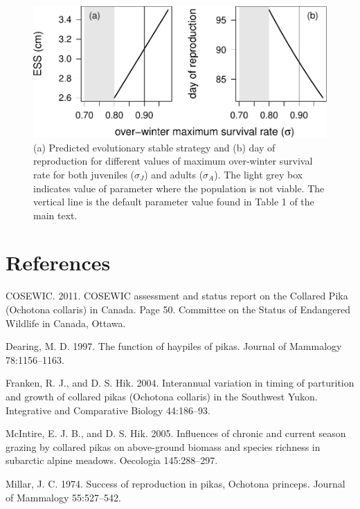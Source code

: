 \documentclass[12pt,]{article}
\begin{document}
\begin{figure}
\centering
\includegraphics{White_et_al_pika_phenology_supp_mat_files/figure-latex/unnamed-chunk-11-1.pdf}
\caption{(a) Predicted evolutionary stable strategy and (b) day of
reproduction for different values of maximum over-winter survival rate
for both juveniles (\(\sigma_J\)) and adults (\(\sigma_A\)). The light
grey box indicates value of parameter where the population is not
viable. The vertical line is the default parameter value found in Table
1 of the main text.\label{fig:ESS_vs_over_winter}}
\end{figure}

\pagebreak

\section{References}\label{references}

\hypertarget{refs}{}
\hypertarget{ref-COSEWIC2011}{}
COSEWIC. 2011. COSEWIC assessment and status report on the Collared Pika
(Ochotona collaris) in Canada. Page 50. Committee on the Status of
Endangered Wildlife in Canada, Ottawa.

\hypertarget{ref-Dearing1997}{}
Dearing, M. D. 1997. The function of haypiles of pikas. Journal of
Mammalogy 78:1156--1163.

\hypertarget{ref-Franken2004b}{}
Franken, R. J., and D. S. Hik. 2004. Interannual variation in timing of
parturition and growth of collared pikas (Ochotona collaris) in the
Southwest Yukon. Integrative and Comparative Biology 44:186--93.

\hypertarget{ref-McIntire2005}{}
McIntire, E. J. B., and D. S. Hik. 2005. Influences of chronic and
current season grazing by collared pikas on above-ground biomass and
species richness in subarctic alpine meadows. Oecologia 145:288--297.

\hypertarget{ref-Millar1974}{}
Millar, J. C. 1974. Success of reproduction in pikas, Ochotona princeps.
Journal of Mammalogy 55:527--542.
\end{document}

